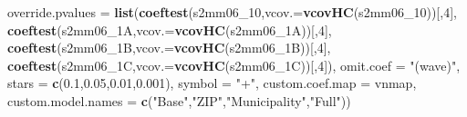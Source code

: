 \documentclass[
]{article}
\newenvironment{Shaded}{\begin{snugshade}}{\end{snugshade}}
\newcommand{\DataTypeTok}[1]{\textcolor[rgb]{0.13,0.29,0.53}{#1}}
\newcommand{\DecValTok}[1]{\textcolor[rgb]{0.00,0.00,0.81}{#1}}
\newcommand{\FloatTok}[1]{\textcolor[rgb]{0.00,0.00,0.81}{#1}}
\newcommand{\KeywordTok}[1]{\textcolor[rgb]{0.13,0.29,0.53}{\textbf{#1}}}
\newcommand{\NormalTok}[1]{#1}
\newcommand{\StringTok}[1]{\textcolor[rgb]{0.31,0.60,0.02}{#1}}
\begin{document}
\begin{Shaded}
\begin{Highlighting}[]
          \DataTypeTok{override.pvalues =} \KeywordTok{list}\NormalTok{(}\KeywordTok{coeftest}\NormalTok{(s2mm06_}\DecValTok{10}\NormalTok{,}\DataTypeTok{vcov.=}\KeywordTok{vcovHC}\NormalTok{(s2mm06_}\DecValTok{10}\NormalTok{))[,}\DecValTok{4}\NormalTok{],}
                                  \KeywordTok{coeftest}\NormalTok{(s2mm06_1A,}\DataTypeTok{vcov.=}\KeywordTok{vcovHC}\NormalTok{(s2mm06_1A))[,}\DecValTok{4}\NormalTok{],}
                                  \KeywordTok{coeftest}\NormalTok{(s2mm06_1B,}\DataTypeTok{vcov.=}\KeywordTok{vcovHC}\NormalTok{(s2mm06_1B))[,}\DecValTok{4}\NormalTok{],}
                                  \KeywordTok{coeftest}\NormalTok{(s2mm06_1C,}\DataTypeTok{vcov.=}\KeywordTok{vcovHC}\NormalTok{(s2mm06_1C))[,}\DecValTok{4}\NormalTok{]),}
          \DataTypeTok{omit.coef =} \StringTok{"(wave)"}\NormalTok{, }\DataTypeTok{stars =} \KeywordTok{c}\NormalTok{(}\FloatTok{0.1}\NormalTok{,}\FloatTok{0.05}\NormalTok{,}\FloatTok{0.01}\NormalTok{,}\FloatTok{0.001}\NormalTok{), }\DataTypeTok{symbol =} \StringTok{"+"}\NormalTok{,}
          \DataTypeTok{custom.coef.map =}\NormalTok{ vnmap, }
          \DataTypeTok{custom.model.names =} \KeywordTok{c}\NormalTok{(}\StringTok{"Base"}\NormalTok{,}\StringTok{"ZIP"}\NormalTok{,}\StringTok{"Municipality"}\NormalTok{,}\StringTok{"Full"}\NormalTok{))}
\end{Highlighting}
\end{Shaded}
\end{document}
